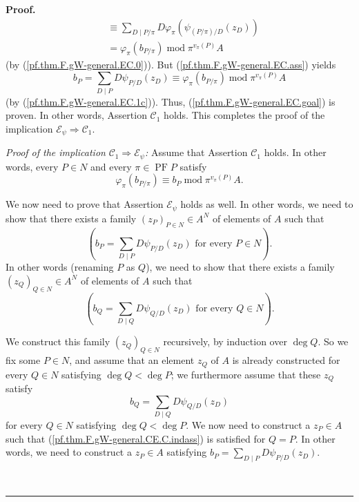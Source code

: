 \documentclass[numbers=enddot,12pt,final,onecolumn,notitlepage]{scrartcl}%
\theoremstyle{definition}
\newenvironment{proof}[1][Proof]{\noindent\textbf{#1.} }{\ \rule{0.5em}{0.5em}}
\let\sumnonlimits\sum
\renewcommand{\sum}{\sumnonlimits\limits}
\begin{document}
\begin{proof}
\begin{align}
&  \equiv\sum_{D\mid P/\pi}D\varphi_{\pi}\left(  \psi_{\left(  P/\pi\right)
/D}\left(  z_{D}\right)  \right) \label{pf.thm.F.gW-general.EC.1b}\\
&  =\varphi_{\pi}\left(  b_{P/\pi}\right)  \operatorname{mod}\pi^{v_{\pi
}\left(  P\right)  }A \label{pf.thm.F.gW-general.EC.1c}%
\end{align}
(by (\ref{pf.thm.F.gW-general.EC.0})). But (\ref{pf.thm.F.gW-general.EC.ass})
yields%
\[
b_{P}=\sum_{D\mid P}D\psi_{P / D}\left(  z_{D}\right)  \equiv\varphi_{\pi
}\left(  b_{P/\pi}\right)  \operatorname{mod}\pi^{v_{\pi}\left(  P\right)  }A
\]
(by (\ref{pf.thm.F.gW-general.EC.1c})). Thus,
(\ref{pf.thm.F.gW-general.EC.goal}) is proven. In other words, Assertion
$\mathcal{C}_{1}$ holds. This completes the proof of the implication
$\mathcal{E}_{\psi}\Longrightarrow\mathcal{C}_{1}$.

\textit{Proof of the implication }$\mathcal{C}_{1}\Longrightarrow
\mathcal{E}_{\psi}$\textit{:} Assume that Assertion $\mathcal{C}_{1}$ holds.
In other words, every $P\in N$ and every $\pi\in\operatorname{PF}P$ satisfy%
\begin{equation}
\varphi_{\pi}\left(  b_{P / \pi}\right)  \equiv b_{P}\operatorname{mod}%
\pi^{v_{\pi}\left(  P\right)  }A. \label{pf.thm.F.gW-general.CE.C}%
\end{equation}


We now need to prove that Assertion $\mathcal{E}_{\psi}$ holds as well. In
other words, we need to show that there exists a family $\left(  z_{P}\right)
_{P\in N}\in A^{N}$ of elements of $A$ such that%
\[
\left(  b_{P}=\sum_{D\mid P}D\psi_{P / D}\left(  z_{D}\right)  \text{ for
every }P\in N\right)  .
\]
In other words (renaming $P$ as $Q$), we need to show that there exists a
family $\left(  z_{Q}\right)  _{Q\in N}\in A^{N}$ of elements of $A$ such that%
\[
\left(  b_{Q}=\sum_{D\mid Q}D\psi_{Q / D}\left(  z_{D}\right)  \text{ for
every }Q\in N\right)  .
\]


We construct this family $\left(  z_{Q}\right)  _{Q\in N}$ recursively, by
induction over $\deg Q$. So we fix some $P\in N$, and assume that an element
$z_{Q}$ of $A$ is already constructed for every $Q\in N$ satisfying $\deg
Q<\deg P$; we furthermore assume that these $z_{Q}$ satisfy%
\begin{equation}
b_{Q}=\sum_{D\mid Q}D\psi_{Q/D}\left(  z_{D}\right)
\label{pf.thm.F.gW-general.CE.C.indass}%
\end{equation}
for every $Q\in N$ satisfying $\deg Q<\deg P$. We now need to construct a
$z_{P}\in A$ such that (\ref{pf.thm.F.gW-general.CE.C.indass}) is satisfied
for $Q=P$. In other words, we need to construct a $z_{P}\in A$ satisfying
$b_{P}=\sum_{D\mid P}D\psi_{P/D}\left(  z_{D}\right)  $.


\end{proof}
\end{document}
